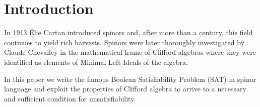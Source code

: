 \documentclass[a4paper,twoside,11pt]{article}
\begin{document}


\begin{abstract}
We present a formulation of the Boolean Satisfiability Problem in spinor language that allows to give a necessary and sufficient condition for unsatisfiability. With this result we outline an algorithm to test for unsatisfiability with possibly interesting theoretical properties.
\end{abstract}


\section{Introduction}
\label{Introduction}
In 1913 {\'{E}}lie Cartan introduced spinors \cite{Cartan_1913, Cartan_1937} and, after more than a century, this field continues to yield rich harvests.
Spinors were later thoroughly investigated by Claude Chevalley \cite{Chevalley_1954} in the mathematical frame of Clifford algebras where they were identified as elements of Minimal Left Ideals of the algebra.

In this paper we write the famous Boolean Satisfiability Problem (SAT) in spinor language and exploit the properties of Clifford algebra to arrive to a necessary and sufficient condition for unsatisfiability.
\end{document}
